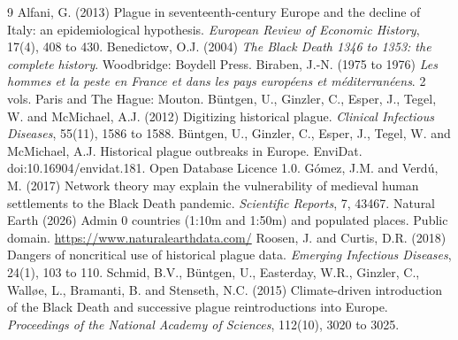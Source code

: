 \documentclass[11pt,a4paper]{article}
\begin{document}
\begin{thebibliography}{9}
 Alfani, G. (2013) Plague in seventeenth-century Europe and the decline of Italy: an epidemiological hypothesis. \emph{European Review of Economic History}, 17(4), 408 to 430.
 Benedictow, O.J. (2004) \emph{The Black Death 1346 to 1353: the complete history}. Woodbridge: Boydell Press.
 Biraben, J.-N. (1975 to 1976) \emph{Les hommes et la peste en France et dans les pays europ\'eens et m\'editerran\'eens}. 2 vols. Paris and The Hague: Mouton.
 B\"untgen, U., Ginzler, C., Esper, J., Tegel, W. and McMichael, A.J. (2012) Digitizing historical plague. \emph{Clinical Infectious Diseases}, 55(11), 1586 to 1588.
 B\"untgen, U., Ginzler, C., Esper, J., Tegel, W. and McMichael, A.J. Historical plague outbreaks in Europe. EnviDat. doi:10.16904/envidat.181. Open Database Licence 1.0.
 G\'omez, J.M. and Verd\'u, M. (2017) Network theory may explain the vulnerability of medieval human settlements to the Black Death pandemic. \emph{Scientific Reports}, 7, 43467.
 Natural Earth (2026) Admin 0 countries (1:10m and 1:50m) and populated places. Public domain. \url{https://www.naturalearthdata.com/}
 Roosen, J. and Curtis, D.R. (2018) Dangers of noncritical use of historical plague data. \emph{Emerging Infectious Diseases}, 24(1), 103 to 110.
 Schmid, B.V., B\"untgen, U., Easterday, W.R., Ginzler, C., Walløe, L., Bramanti, B. and Stenseth, N.C. (2015) Climate-driven introduction of the Black Death and successive plague reintroductions into Europe. \emph{Proceedings of the National Academy of Sciences}, 112(10), 3020 to 3025.
\end{thebibliography}
\end{document}
